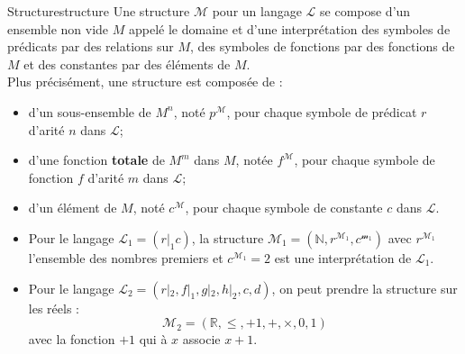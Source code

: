 \begin{definition}{Structure}{structure}
    Une structure $\mathcal{M}$ pour un langage $\mathcal{L}$ se compose d'un ensemble non vide $M$ appelé le domaine et d'une 
    interprétation des symboles de prédicats par des relations sur $M$, des symboles de fonctions par des fonctions de $M$ et 
    des constantes par des éléments de $M$.\\
    Plus précisément, une structure est composée de :
    \begin{itemize}[label=\textbullet]
        \item d'un sous-ensemble de $M^n$, noté $p^\mathcal{M}$, pour chaque symbole de prédicat $r$ d'arité $n$ dans $\mathcal{L}$;
        \item d'une fonction \textbf{totale} de $M^m$ dans $M$, notée $f^\mathcal{M}$, pour chaque symbole de fonction $f$ d'arité 
        $m$ dans $\mathcal{L}$;
        \item d'un élément de $M$, noté $c^\mathcal{M}$, pour chaque symbole de constante $c$ dans $\mathcal{L}$.
    \end{itemize}
\end{definition}
\begin{example}
    \begin{itemize}
        \item Pour le langage $\mathcal{L}_1 = (r|_1c)$, la structure $\mathcal{M}_1 = (\mathbb{N}, r^{\mathcal{M}_1}, c^{\mathcal{m}_1})$ 
        avec $r^{\mathcal{M}_1}$ l'ensemble des nombres premiers et $c^{\mathcal{M}_1} = 2$ est une interprétation de $\mathcal{L}_1$.
        \item Pour le langage $\mathcal{L}_2 = (r|_2,f|_1,g|_2,h|_2,c,d)$, on peut prendre la structure sur les réels :
        \begin{equation*}
            \mathcal{M}_2 = (\mathbb{R}, \leq, +1,+,\times,0,1)
        \end{equation*}
        avec la fonction $+1$ qui à $x$ associe $x+1$.
    \end{itemize}
\end{example}
